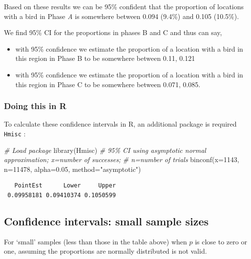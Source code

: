 \documentclass[
  oneside]{krantz}
\newenvironment{Shaded}{\begin{snugshade}}{\end{snugshade}}
\newcommand{\AttributeTok}[1]{\textcolor[rgb]{0.77,0.63,0.00}{#1}}
\newcommand{\CommentTok}[1]{\textcolor[rgb]{0.56,0.35,0.01}{\textit{#1}}}
\newcommand{\DecValTok}[1]{\textcolor[rgb]{0.00,0.00,0.81}{#1}}
\newcommand{\FloatTok}[1]{\textcolor[rgb]{0.00,0.00,0.81}{#1}}
\newcommand{\FunctionTok}[1]{\textcolor[rgb]{0.00,0.00,0.00}{#1}}
\newcommand{\NormalTok}[1]{#1}
\newcommand{\StringTok}[1]{\textcolor[rgb]{0.31,0.60,0.02}{#1}}
\begin{document}
Based on these results we can be 95\% confident that the proportion of locations with a bird in Phase \emph{A} is somewhere between 0.094 (9.4\%) and 0.105 (10.5\%).

We find 95\% CI for the proportions in phases B and C and thus can say,

\begin{itemize}
\item
  with 95\% confidence we estimate the proportion of a location with a bird in this region in Phase B to be somewhere between 0.11, 0.121
\item
  with 95\% confidence we estimate the proportion of a location with a bird in this region in Phase C to be somewhere between 0.071, 0.085.
\end{itemize}

\hypertarget{doing-this-in-r-19}{%
\subsubsection{Doing this in R}\label{doing-this-in-r-19}}

To calculate these confidence intervals in R, an additional package is required \texttt{Hmisc} \citep{R-Hmisc}:

\begin{Shaded}
\begin{Highlighting}[]
\CommentTok{\# Load package}
\FunctionTok{library}\NormalTok{(Hmisc)}
\CommentTok{\# 95\% CI using asymptotic normal approximation; x=number of successes; }
\CommentTok{\#   n=number of trials}
\FunctionTok{binconf}\NormalTok{(}\AttributeTok{x=}\DecValTok{1143}\NormalTok{, }\AttributeTok{n=}\DecValTok{11478}\NormalTok{, }\AttributeTok{alpha=}\FloatTok{0.05}\NormalTok{, }\AttributeTok{method=}\StringTok{"asymptotic"}\NormalTok{)}
\end{Highlighting}
\end{Shaded}

\begin{verbatim}
   PointEst      Lower     Upper
 0.09958181 0.09410374 0.1050599
\end{verbatim}

\hypertarget{confidence-intervals-small-sample-sizes}{%
\subsection{Confidence intervals: small sample sizes}\label{confidence-intervals-small-sample-sizes}}

For `small' samples (less than those in the table above) when \(p\) is close to zero or one, assuming the proportions are normally distributed is not valid.
\end{document}
